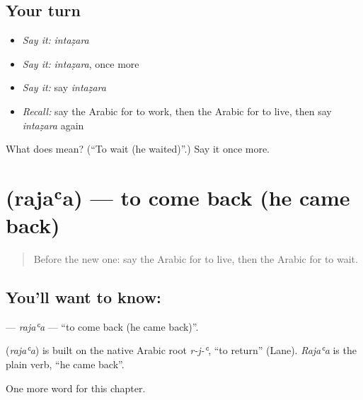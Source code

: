 \subsection*{Your turn}
\begin{itemize}
\raggedright
  \item \emph{Say it:} \emph{intaẓara}
  \item \emph{Say it:} \emph{intaẓara}, once more
  \item \emph{Say it:} say \emph{intaẓara}
  \item \emph{Recall:} say the Arabic for to work, then the Arabic for to live, then say \emph{intaẓara} again
\end{itemize}

\begin{tcolorbox}[breakable,colback=teal!4,colframe=teal!35!black,title={Before you move on}]
What does  mean? (\textquotedblleft{}To wait (he waited)\textquotedblright{}.) Say it once more.
\end{tcolorbox}
\section[\texorpdfstring{\ar{رجع} (rajaʿa)}{رجع (rajaʿa)}]{ (rajaʿa) — to come back (he came back)}

\label{lesson:AR-C64-rajaa}



\begin{quote}
Before the new one: say the Arabic for to live, then the Arabic for to wait.
\end{quote}

\subsection*{You'll want to know: }
\textbf{} — \emph{rajaʿa} — \textquotedblleft{}to come back (he came back)\textquotedblright{}.

\begin{cousinweb}
\textbf{} (\emph{rajaʿa}) is built on the native Arabic root \emph{r-j-ʿ}, \textquotedblleft{}to return\textquotedblright{} (Lane). \emph{Rajaʿa} is the plain verb, \textquotedblleft{}he came back\textquotedblright{}.
\end{cousinweb}

\begin{grammarlens}[title={What you've built}]
One more word for this chapter.
\end{grammarlens}

